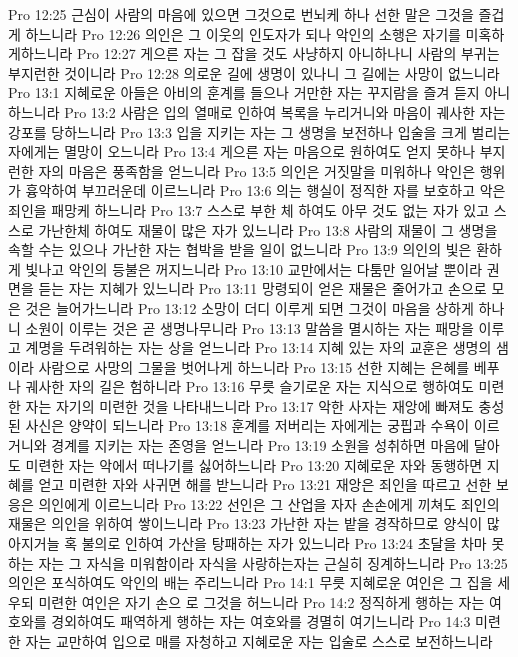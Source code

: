 Pro 12:25  근심이 사람의 마음에 있으면 그것으로 번뇌케 하나 선한 말은 그것을 즐겁게 하느니라
Pro 12:26  의인은 그 이웃의 인도자가 되나 악인의 소행은 자기를 미혹하게하느니라
Pro 12:27  게으른 자는 그 잡을 것도 사냥하지 아니하나니 사람의 부귀는 부지런한 것이니라
Pro 12:28  의로운 길에 생명이 있나니 그 길에는 사망이 없느니라
Pro 13:1  지혜로운 아들은 아비의 훈계를 들으나 거만한 자는 꾸지람을 즐겨 듣지 아니하느니라
Pro 13:2  사람은 입의 열매로 인하여 복록을 누리거니와 마음이 궤사한 자는 강포를 당하느니라
Pro 13:3  입을 지키는 자는 그 생명을 보전하나 입술을 크게 벌리는 자에게는 멸망이 오느니라
Pro 13:4  게으른 자는 마음으로 원하여도 얻지 못하나 부지런한 자의 마음은 풍족함을 얻느니라
Pro 13:5  의인은 거짓말을 미워하나 악인은 행위가 흉악하여 부끄러운데 이르느니라
Pro 13:6  의는 행실이 정직한 자를 보호하고 악은 죄인을 패망케 하느니라
Pro 13:7  스스로 부한 체 하여도 아무 것도 없는 자가 있고 스스로 가난한체 하여도 재물이 많은 자가 있느니라
Pro 13:8  사람의 재물이 그 생명을 속할 수는 있으나 가난한 자는 협박을 받을 일이 없느니라
Pro 13:9  의인의 빛은 환하게 빛나고 악인의 등불은 꺼지느니라
Pro 13:10  교만에서는 다툼만 일어날 뿐이라 권면을 듣는 자는 지혜가 있느니라
Pro 13:11  망령되이 얻은 재물은 줄어가고 손으로 모은 것은 늘어가느니라
Pro 13:12  소망이 더디 이루게 되면 그것이 마음을 상하게 하나니 소원이 이루는 것은 곧 생명나무니라
Pro 13:13  말씀을 멸시하는 자는 패망을 이루고 계명을 두려워하는 자는 상을 얻느니라
Pro 13:14  지혜 있는 자의 교훈은 생명의 샘이라 사람으로 사망의 그물을 벗어나게 하느니라
Pro 13:15  선한 지혜는 은혜를 베푸나 궤사한 자의 길은 험하니라
Pro 13:16  무릇 슬기로운 자는 지식으로 행하여도 미련한 자는 자기의 미련한 것을 나타내느니라
Pro 13:17  악한 사자는 재앙에 빠져도 충성된 사신은 양약이 되느니라
Pro 13:18  훈계를 저버리는 자에게는 궁핍과 수욕이 이르거니와 경계를 지키는 자는 존영을 얻느니라
Pro 13:19  소원을 성취하면 마음에 달아도 미련한 자는 악에서 떠나기를 싫어하느니라
Pro 13:20  지혜로운 자와 동행하면 지혜를 얻고 미련한 자와 사귀면 해를 받느니라
Pro 13:21  재앙은 죄인을 따르고 선한 보응은 의인에게 이르느니라
Pro 13:22  선인은 그 산업을 자자 손손에게 끼쳐도 죄인의 재물은 의인을 위하여 쌓이느니라
Pro 13:23  가난한 자는 밭을 경작하므로 양식이 많아지거늘 혹 불의로 인하여 가산을 탕패하는 자가 있느니라
Pro 13:24  초달을 차마 못하는 자는 그 자식을 미워함이라 자식을 사랑하는자는 근실히 징계하느니라
Pro 13:25  의인은 포식하여도 악인의 배는 주리느니라
Pro 14:1  무릇 지혜로운 여인은 그 집을 세우되 미련한 여인은 자기 손으 로 그것을 허느니라
Pro 14:2  정직하게 행하는 자는 여호와를 경외하여도 패역하게 행하는 자는 여호와를 경멸히 여기느니라
Pro 14:3  미련한 자는 교만하여 입으로 매를 자청하고 지혜로운 자는 입술로 스스로 보전하느니라
